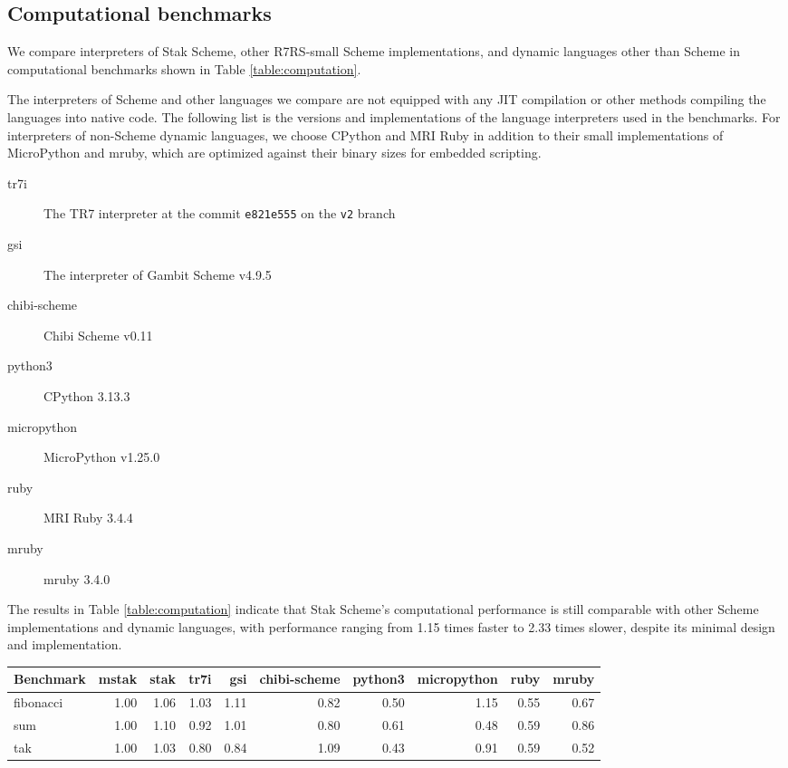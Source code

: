 \documentclass[sigplan, anonymous, review]{acmart}
\begin{document}
\subsection{Computational benchmarks}

We compare interpreters of Stak Scheme, other R7RS-small Scheme
implementations, and
dynamic languages other than Scheme in computational
benchmarks shown in Table \ref{table:computation}.

The interpreters of Scheme and other languages we compare are not
equipped with
any JIT compilation or other methods compiling the languages into
native code.
The following list is the versions and implementations of
the language interpreters used in the benchmarks.
For interpreters of non-Scheme dynamic languages, we choose CPython and
MRI Ruby in addition to their small implementations of MicroPython
and mruby, which are optimized against their binary sizes for
embedded scripting.

\begin{description}
  \item[tr7i] The TR7 interpreter at the commit \texttt{e821e555}
    on the \texttt{v2} branch
  \item[gsi] The interpreter of Gambit Scheme v4.9.5
  \item[chibi-scheme] Chibi Scheme v0.11
  \item[python3] CPython 3.13.3
  \item[micropython] MicroPython v1.25.0
  \item[ruby] MRI Ruby 3.4.4
  \item[mruby] mruby 3.4.0
\end{description}

The results in Table \ref{table:computation} indicate that Stak
Scheme's computational performance is still comparable with other
Scheme implementations and dynamic languages, with performance
ranging from 1.15 times faster to 2.33 times slower,
despite its minimal design and implementation.

\begin{table*}
  \begin{center}
    \caption{Computational benchmarks (relative time. lower is better.)}
    \label{table:computation}
    \begin{tabular}{l|rrrrrrrrr}
      \hline
      Benchmark & mstak & stak & tr7i & gsi & chibi-scheme & python3
      & micropython & ruby & mruby \\
      \hline
      fibonacci & 1.00 & 1.06 & 1.03 & 1.11 & 0.82 & 0.50 & 1.15 &
      0.55 & 0.67 \\
      sum & 1.00 & 1.10 & 0.92 & 1.01 & 0.80 & 0.61 & 0.48 & 0.59 & 0.86 \\
      tak & 1.00 & 1.03 & 0.80 & 0.84 & 1.09 & 0.43 & 0.91 & 0.59 & 0.52 \\
      \hline
    \end{tabular}
  \end{center}
\end{table*}
\end{document}
